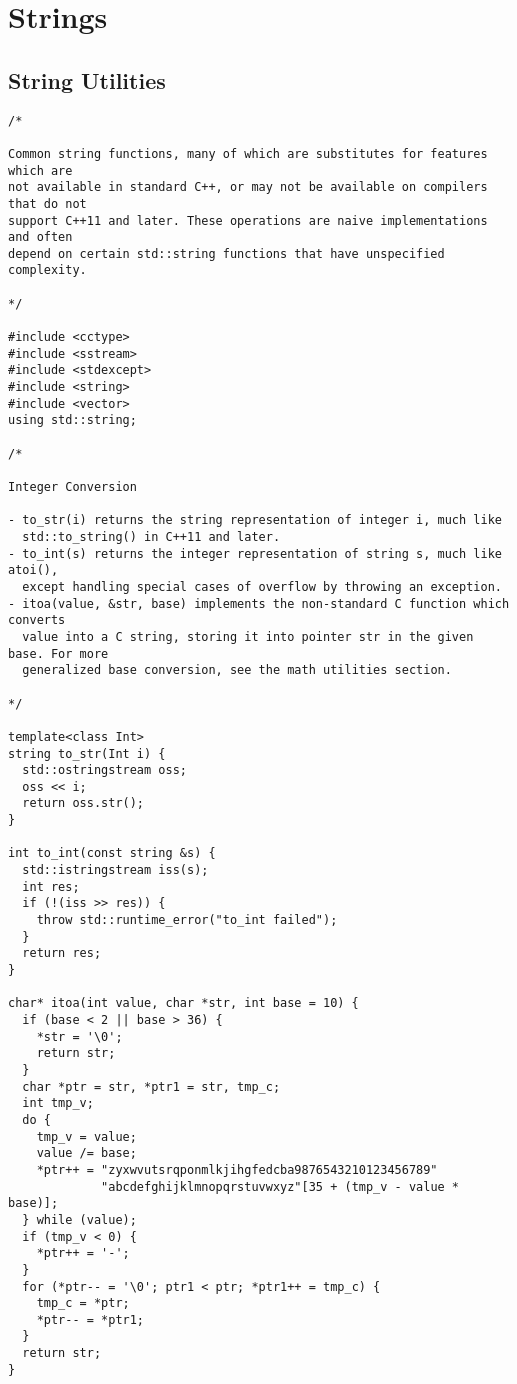 \chapter{Strings}

\section{String Utilities}
\setcounter{section}{1}
\begin{lstlisting}
/*

Common string functions, many of which are substitutes for features which are
not available in standard C++, or may not be available on compilers that do not
support C++11 and later. These operations are naive implementations and often
depend on certain std::string functions that have unspecified complexity.

*/

#include <cctype>
#include <sstream>
#include <stdexcept>
#include <string>
#include <vector>
using std::string;

/*

Integer Conversion

- to_str(i) returns the string representation of integer i, much like
  std::to_string() in C++11 and later.
- to_int(s) returns the integer representation of string s, much like atoi(),
  except handling special cases of overflow by throwing an exception.
- itoa(value, &str, base) implements the non-standard C function which converts
  value into a C string, storing it into pointer str in the given base. For more
  generalized base conversion, see the math utilities section.

*/

template<class Int>
string to_str(Int i) {
  std::ostringstream oss;
  oss << i;
  return oss.str();
}

int to_int(const string &s) {
  std::istringstream iss(s);
  int res;
  if (!(iss >> res)) {
    throw std::runtime_error("to_int failed");
  }
  return res;
}

char* itoa(int value, char *str, int base = 10) {
  if (base < 2 || base > 36) {
    *str = '\0';
    return str;
  }
  char *ptr = str, *ptr1 = str, tmp_c;
  int tmp_v;
  do {
    tmp_v = value;
    value /= base;
    *ptr++ = "zyxwvutsrqponmlkjihgfedcba9876543210123456789"
             "abcdefghijklmnopqrstuvwxyz"[35 + (tmp_v - value * base)];
  } while (value);
  if (tmp_v < 0) {
    *ptr++ = '-';
  }
  for (*ptr-- = '\0'; ptr1 < ptr; *ptr1++ = tmp_c) {
    tmp_c = *ptr;
    *ptr-- = *ptr1;
  }
  return str;
}


\end{lstlisting}
